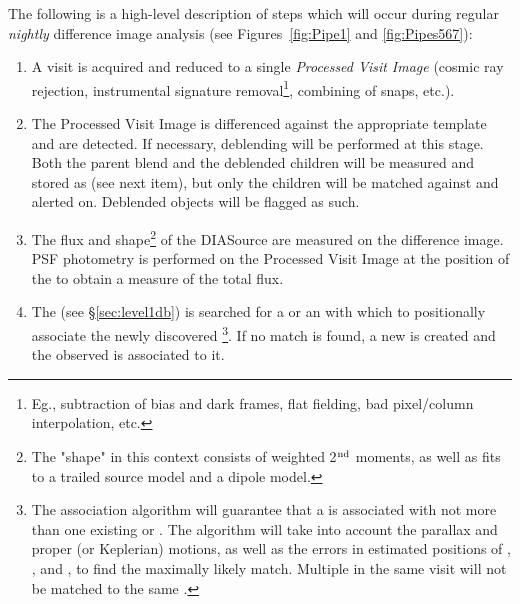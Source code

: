 The following is a high-level description of steps which will occur during regular \emph{nightly} difference image analysis (see Figures~\ref{fig:Pipe1} and \ref{fig:Pipes567}):
\begin{enumerate}

\item A visit is acquired and reduced to a single \emph{Processed Visit Image} (cosmic ray rejection, instrumental signature removal\footnote{Eg., subtraction of bias and dark frames, flat fielding, bad pixel/column interpolation, etc.}, combining of snaps, etc.).
\item The Processed Visit Image is differenced against the appropriate template and \DIASources are detected. 
If necessary, deblending will be performed at this stage. Both the parent blend and the deblended children will be measured and stored as \DIASources (see next item), but only the children will be matched against \DIAObjects and alerted on. Deblended objects will be flagged as such.
\item The flux and shape\footnote{The "shape" in this context consists of weighted 2$^{\rm{nd}}$ moments, as well as fits to a trailed source model and a dipole model.} of the DIASource are measured on the difference image. 
PSF photometry is performed on the Processed Visit Image at the position of the \DIASource to obtain a measure of the total flux.
\item The \PPDB (see \S \ref{sec:level1db}) is searched for a \DIAObject or an \SSObject with which to positionally associate the newly discovered \DIASource\footnote{The association algorithm will guarantee that a \DIASource is associated with not more than one existing \DIAObject or \SSObject. The algorithm will take into account the parallax and proper (or Keplerian) motions, as well as the errors in estimated positions of \DIAObject, \SSObject, and \DIASource, to find the maximally likely match. Multiple \DIASources in the same visit will not be matched to the same \DIAObject.}. If no match is found, a new \DIAObject is created and the observed \DIASource is associated to it.


\end{enumerate}
